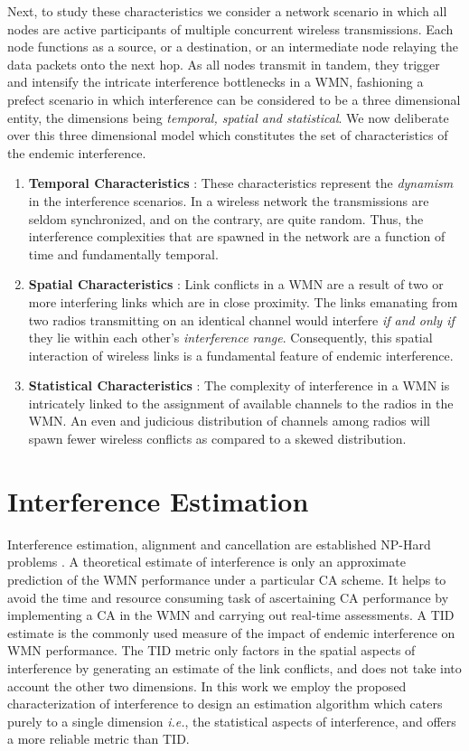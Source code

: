 \documentclass[conference]{IEEEtran}
\begin{document}
Next, to study these characteristics we consider a network scenario in which all nodes are active participants of multiple concurrent wireless transmissions. Each node functions as a source, or a destination, or an intermediate node relaying the data packets onto the  next hop. As all nodes transmit in tandem, they trigger and intensify the intricate interference bottlenecks in a WMN, fashioning a prefect scenario in which interference can be considered to be a three dimensional entity, the dimensions being \textit{temporal, spatial and statistical}. We now deliberate over this three dimensional model which constitutes the set of characteristics of the endemic interference. 
\begin{enumerate}
 \item \textbf{Temporal Characteristics} : These characteristics represent the \textit{dynamism} in the interference scenarios. In a wireless network the transmissions are seldom synchronized, and on the contrary, are quite random. Thus, the interference complexities that are spawned in the network are a function of time and fundamentally temporal. 
 \item \textbf{Spatial Characteristics} : Link conflicts in a WMN are a result of two or more interfering links which are in close proximity. The links emanating from two radios transmitting on an identical channel would interfere \textit{if and only if} they lie within each other's \textit{interference range}. Consequently, this spatial interaction of wireless links is a fundamental feature of endemic interference.
 \item \textbf{Statistical Characteristics} : The complexity of interference in a WMN is intricately linked to the assignment of available channels to the radios in the WMN. An even and judicious distribution of channels among radios will spawn fewer wireless conflicts as compared to a skewed distribution. 
\end{enumerate}

\section{Interference Estimation}
Interference estimation, alignment and cancellation are established NP-Hard problems \cite{Alignment}. A theoretical estimate of interference is only an approximate prediction of the WMN performance under a particular CA scheme. It helps to avoid the time and resource consuming task of ascertaining CA performance by implementing a CA in the WMN and carrying out real-time assessments. A TID estimate is the commonly used measure of the impact of endemic interference on WMN performance. The TID metric only factors in the spatial aspects of interference by generating an estimate of the link conflicts, and does not take into account the other two dimensions. In this work we employ the proposed characterization of interference to design an estimation algorithm which caters purely to a single dimension \emph{i.e.}, the statistical aspects of interference, and offers a more reliable metric than TID. 
\end{document}
